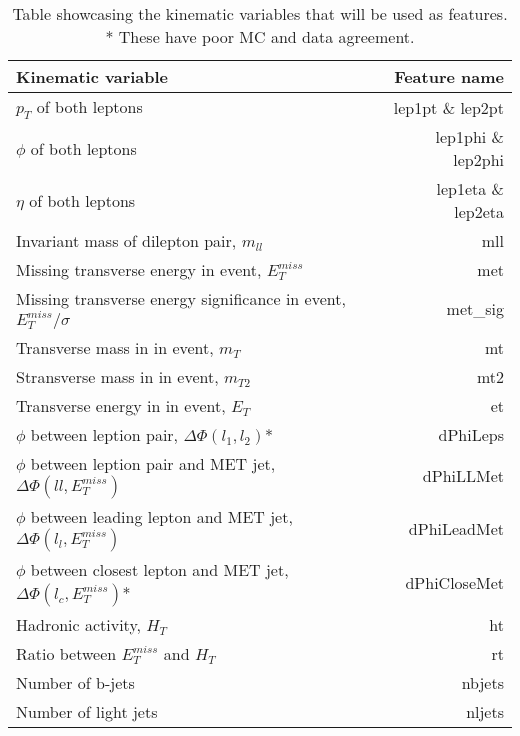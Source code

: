 \documentclass[14pt, a4paper]{book}
\begin{document}
\begin{table}[!h]
    \centering
    \begin{tabular}{l|r}\midrule\midrule
        Kinematic variable                                                              & Feature name          \\\midrule
        $p_T$ of both leptons                                                           & lep1pt \& lep2pt      \\
        $\phi$ of both leptons                                                          & lep1phi \& lep2phi    \\
        $\eta$ of both leptons                                                          & lep1eta \& lep2eta    \\
        Invariant mass of dilepton pair, $m_{ll}$                                       & mll \\
        Missing transverse energy in event, $E_T^{miss}$                                & met \\
        Missing transverse energy significance in event, $E_T^{miss}/\sigma$            & met\_sig \\
        Transverse mass in in event, $m_T$                                              & mt \\
        Stransverse mass in in event, $m_{T2}$                                          & mt2\\
        Transverse energy in in event, $E_T$                                            & et \\
        $\phi$ between leption pair, $\Delta\Phi(l_1,l_2)$*                             & dPhiLeps \\
        $\phi$ between leption pair and MET jet, $\Delta\Phi(ll,E_T^{miss})$            & dPhiLLMet \\
        $\phi$ between leading lepton and MET jet, $\Delta\Phi(l_l,E_T^{miss})$         & dPhiLeadMet \\
        $\phi$ between closest lepton and MET jet, $\Delta\Phi(l_c,E_T^{miss})$*        & dPhiCloseMet \\
        Hadronic activity, $H_T$                                                        & ht\\
        Ratio between $E_T^{miss}$ and $H_T$                                            & rt\\
        Number of b-jets                                                                & nbjets         \\
        Number of light jets                                                            & nljets         \\\midrule\midrule
    \end{tabular}
    \caption[Kinematic variables used as features]{Table showcasing the kinematic variables that will be used as features.\\ * These have poor MC and data agreement.}
    \label{tab:variables}
\end{table}
\end{document}
